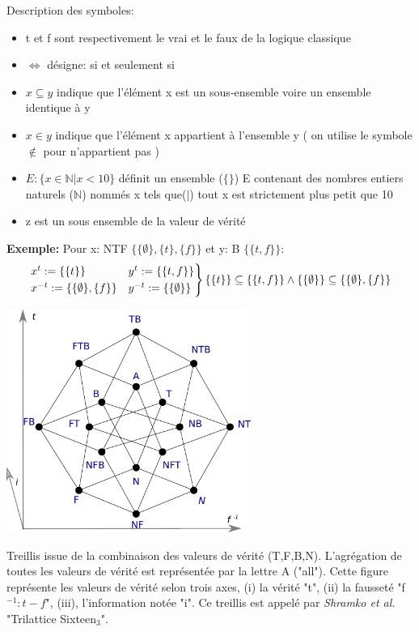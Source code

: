 \begin{refsegment}
    Description des symboles:\nolisttopbreak
    \begin{itemize}
        \item t et f sont respectivement le vrai et le faux de la logique classique
        \item $\iff$ désigne: si et seulement si
        \item $x \subseteq y$  indique que  l'élément x est un sous-ensemble voire un ensemble identique à y
        \item $x \in y$ indique que l'élément x appartient à l'ensemble y ( on utilise le symbole  $\notin$ pour n'appartient pas )
        \item $E : \{ x \in \mathbb{N} | x < 10 \}$ définit un ensemble ($\{\}$) E contenant des nombres entiers naturels ($\mathbb{N}$) nommés x tels que($|$) tout x est strictement plus petit que 10
        \item z est un sous ensemble de la valeur de vérité
    \end{itemize}

    \textbf{Exemple:} Pour x: NTF $\{\{\emptyset\},\{t\},\{f\}\}$ et y: B $\{\{t,f\}\}$:\nolisttopbreak \vspace{-0.5cm}
    \begin{equation*}
    \begin{rcases}
    x^{t}  := \{ \{t\} \}               &y^{t}  := \{ \{t,f\} \}\\
    x^{-t} := \{\{\emptyset\},\{f\} \}  &y^{-t} := \{ \{\emptyset\} \} \\
    \end{rcases}
     \{ \{t\} \} \subseteq \{ \{t,f\} \} \land \{ \{\emptyset\} \} \subseteq \{\{\emptyset\},\{f\} \}
    \end{equation*}


    \begin{shadedfigure}[H]
        \centering
        \includegraphics[width=0.6\textwidth]{img/Generalized_Truth_Values_and_Multilattices.pdf}
        \caption{ Treillis issue de la combinaison des valeurs de vérité (T,F,B,N). L'agrégation de toutes les valeurs de vérité est représentée par la lettre A ("all"). Cette figure représente les valeurs de vérité selon trois axes, (i) la vérité "t", (ii) la fausseté "f$^{-1}: t -f $", (iii), l'information notée "i". Ce treillis est appelé par \textit{Shramko et al.} "Trilattice Sixteen$_{3}$".  }
        \label{fig:sixteen_truth_values}
    \end{shadedfigure}


\end{refsegment}
